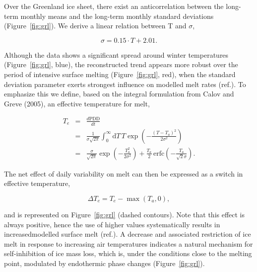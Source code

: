 \documentclass[review]{igs}
\begin{document}
Over the Greenland ice sheet, there exist an anticorrelation between the long-term monthly means and the long-term monthly standard deviations (Figure~\ref{fig:grl}). We derive a linear relation between T and $\sigma$,

\begin{equation}
    \sigma = 0.15 \cdot T + 2.01.
\end{equation}

Although the data shows a significant spread around winter temperatures (Figure~\ref{fig:grl}, blue), the reconstructed trend appears more robust over the period of intensive surface melting (Figure~\ref{fig:grl}, red), when the standard deviation parameter exerts strongest influence on modelled melt rates (ref.). To emphasize this we define, based on the integral formulation from Calov and Greve (2005), an effective temperature for melt,

\begin{eqnarray} \label{eq:calovgreve}
    T_e &=& \frac{d\mathrm{PDD}}{dt}\\
        &=& \frac{1}{\sigma\sqrt{2\pi}}
            \int_{0}^{\infty} \mathrm{d}T \, T \exp\left({-\frac{(T-T_a)^2}{2\sigma^2}}\right)\\
        &=& \frac{\sigma}{\sqrt{2\pi}} \exp\left({-\frac{T_a^2}{2\sigma^2}}\right)
            + \frac{T_a}{2} \, \mathrm{erfc} \left(-\frac{T_a}{\sqrt{2}\sigma}\right).
\end{eqnarray}

The net effect of daily variability on melt can then be expressed as a switch in effective temperature,

\begin{equation}
    \Delta T_e = T_e - \max(T_a, 0),
\end{equation}

and is represented on Figure~\ref{fig:grl} (dashed contours). Note that this effect is always positive, hence the use of higher  values systematically results in increasedmodelled surface melt (ref.). A  decrease and associated restriction of ice melt in response to increasing air temperatures indicates a natural mechanism for self-inhibition of ice mass loss, which is, under the conditions close to the melting point, modulated by endothermic phase changes (Figure~\ref{fig:grl}).
\end{document}
